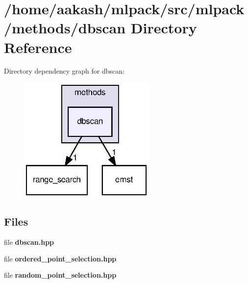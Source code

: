 \section{/home/aakash/mlpack/src/mlpack/methods/dbscan Directory Reference}
\label{dir_9706a54a818a8a8f60d990f75cc3c60c}
Directory dependency graph for dbscan\+:
\nopagebreak
\begin{figure}[H]
\begin{center}
\leavevmode
\includegraphics[width=192pt]{dir_9706a54a818a8a8f60d990f75cc3c60c_dep}
\end{center}
\end{figure}
\subsection*{Files}
\begin{DoxyCompactItemize}
\item 
file \textbf{ dbscan.\+hpp}
\item 
file \textbf{ ordered\+\_\+point\+\_\+selection.\+hpp}
\item 
file \textbf{ random\+\_\+point\+\_\+selection.\+hpp}
\end{DoxyCompactItemize}
